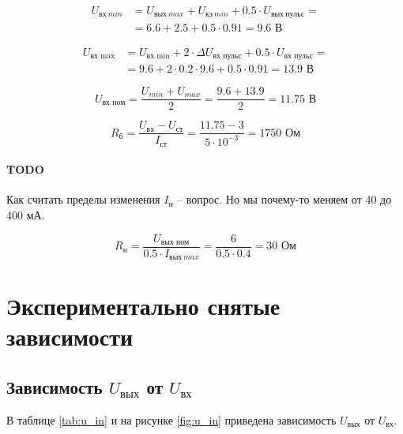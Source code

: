 \begin{displaymath}
\begin{aligned}
	U_{\text{вх}\ min} &= U_{\text{вых}\ max} + U_{\text{кэ}\ min} + 0.5 \cdot U_{\text{вых}\ пульс} = \\ &= 6.6 + 2.5 + 0.5 \cdot 0.91 = 9.6 \text{ В}
\end{aligned}
\end{displaymath}

\begin{displaymath}
\begin{aligned}
	U_\text{вх\ max} &= U_\text{вх\ min} + 2 \cdot \Delta U_\text{вх\ пульс} + 0.5 \cdot U_\text{вх\ пульс} = \\ &= 9.6 + 2 \cdot 0.2 \cdot 9.6 + 0.5 \cdot 0.91 = 13.9 \text{ В}
\end{aligned}
\end{displaymath}

\begin{displaymath}
	U_\text{вх\ ном} = \frac{U_{min} + U_{max}}{2} = \frac{9.6 + 13.9}{2} = 11.75 \text{ В}
\end{displaymath}

\begin{displaymath}
	R_\text{б} = \frac{U_\text{вх} - U_\text{ст}}{I_\text{ст}} = \frac{11.75 - 3}{5 \cdot 10^{-3}} = 1750 \text{ Ом}
\end{displaymath}

\paragraph{TODO} Как считать пределы изменения $I_\text{н}$ -- вопрос. Но мы почему-то меняем от 40 до 400 мА.

\begin{displaymath}
	R_\text{н} = \frac{U_\text{вых ном}}{0.5 \cdot I_{\text{вых}\ max}} = \frac{6}{0.5 \cdot 0.4} = 30 \text{ Ом}
\end{displaymath}

\section{Экспериментально снятые зависимости}

\subsection{Зависимость $U_\text{вых}$ от $U_\text{вх}$}

В таблице \ref{tab:u_in} и на рисунке \ref{fig:u_in} приведена зависимость $U_\text{вых}$ от $U_\text{вх}$.

